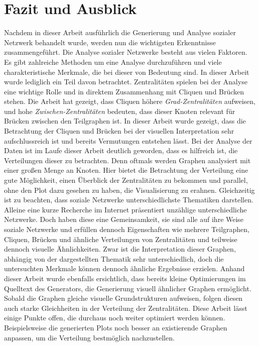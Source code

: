 \chapter{Fazit und Ausblick}\label{ch:fazit}

Nachdem in dieser Arbeit ausführlich die Generierung und Analyse sozialer Netzwerk behandelt wurde, werden nun die wichtigsten Erkenntnisse zusammengeführt. Die Analyse sozialer Netzwerke besteht aus vielen Faktoren. Es gibt zahlreiche Methoden um eine Analyse durchzuführen und viele charakteristische Merkmale, die bei dieser von Bedeutung sind. In dieser Arbeit wurde lediglich ein Teil davon betrachtet. Zentralitäten spielen bei der Analyse eine wichtige Rolle und in direktem Zusammenhang mit Cliquen und Brücken stehen. Die Arbeit hat gezeigt, dass Cliquen höhere \textit{Grad-Zentralitäten} aufweisen, und hohe \textit{Zwischen-Zentralitäten} bedeuten, dass dieser Knoten relevant für Brücken zwischen den Teilgraphen ist. In dieser Arbeit wurde gezeigt, dass die Betrachtung der Cliquen und Brücken bei der visuellen Interpretation sehr aufschlussreich ist und bereits Vermutungen entstehen lässt. Bei der Analyse der Daten ist im Laufe dieser Arbeit deutlich geworden, dass es hilfreich ist, die Verteilungen dieser zu betrachten. Denn oftmals werden Graphen analysiert mit einer großen Menge an Knoten. Hier bietet die Betrachtung der Verteilung eine gute Möglichkeit, einen Überblick der Zentralitäten zu bekommen und parallel, ohne den Plot dazu gesehen zu haben, die Visualisierung zu erahnen. Gleichzeitig ist zu beachten, dass soziale Netzwerke unterschiedlichste Thematiken darstellen. Alleine eine kurze Recherche im Internet präsentiert unzählige unterschiedliche Netzwerke. Doch haben diese eine Gemeinsamkeit, sie sind alle auf ihre Weise soziale Netzwerke und erfüllen dennoch Eigenschaften wie mehrere Teilgraphen, Cliquen, Brücken und ähnliche Verteilungen von Zentralitäten und teilweise dennoch visuelle Ähnlichkeiten. Zwar ist die Interpretation dieser Graphen, abhängig von der dargestellten Thematik sehr unterschiedlich, doch die untersuchten Merkmale können dennoch ähnliche Ergebnisse erzielen. Anhand dieser Arbeit wurde ebenfalls ersichtlich, dass bereits kleine Optimierungen im Quelltext des Generators, die Generierung visuell ähnlicher Graphen ermöglicht. Sobald die Graphen gleiche visuelle Grundstrukturen aufweisen, folgen diesen auch starke Gleichheiten in der Verteilung der Zentralitäten. Diese Arbeit lässt einige Punkte offen, die durchaus noch weiter optimiert werden können. Beispielsweise die generierten Plots noch besser an existierende Graphen anpassen, um die Verteilung bestmöglich nachzustellen. 
